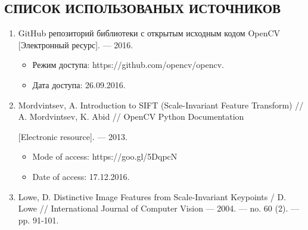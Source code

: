 \begin{center}
    \section*{СПИСОК ИСПОЛЬЗОВАНЫХ ИСТОЧНИКОВ}
\end{center}

\begin{enumerate}
    \label{opencv}
    \item GitHub репозиторий библиотеки с открытым исходным кодом OpenCV [Электронный ресурс]. — 2016.
    \begin{itemize}
        \item Режим доступа: https://github.com/opencv/opencv.
        \item Дата доступа: 26.09.2016.
    \end{itemize}

    \label{opencv-sift}
    \item Mordvintsev, A. Introduction to SIFT (Scale-Invariant Feature Transform) // A. Mordvintsev, K. Abid // OpenCV Python Documentation
    
    [Electronic resource]. — 2013. 
    \begin{itemize} 
        \item Mode of access: https://goo.gl/5DqpcN
        \item Date of access: 17.12.2016.
    \end{itemize}
    
    \label{lowe}
    \item Lowe, D. Distinctive Image Features from Scale-Invariant Keypoints / D. Lowe // International Journal of Computer Vision — 2004. — no. 60 (2). — pp. 91-101.
\end{enumerate}

\newpage